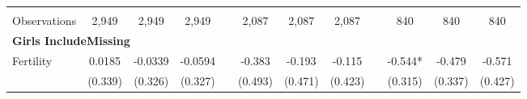 \begin{landscape}
\begin{table}[htpb!]
\begin{center}
\begin{tabular}{lcccp{2mm}cccp{2mm}ccc}
\begin{footnotesize}\end{footnotesize}&\begin{footnotesize}\end{footnotesize}&\begin{footnotesize}\end{footnotesize}&\begin{footnotesize}\end{footnotesize}&\begin{footnotesize}\end{footnotesize}&\begin{footnotesize}\end{footnotesize}&\begin{footnotesize}\end{footnotesize}&\begin{footnotesize}\end{footnotesize}&\begin{footnotesize}\end{footnotesize}&\begin{footnotesize}\end{footnotesize}&\begin{footnotesize}\end{footnotesize}&\begin{footnotesize}\end{footnotesize}\\Observations&2,949&2,949&2,949&&2,087&2,087&2,087&&840&840&840\\
\multicolumn{12}{l}{\textbf{Girls IncludeMissing}}\\ 
Fertility&0.0185&-0.0339&-0.0594&&-0.383&-0.193&-0.115&&-0.544*&-0.479&-0.571\\
&(0.339)&(0.326)&(0.327)&&(0.493)&(0.471)&(0.423)&&(0.315)&(0.337)&(0.427)\\

\end{tabular}
\end{center}
\end{table}
\end{landscape}

